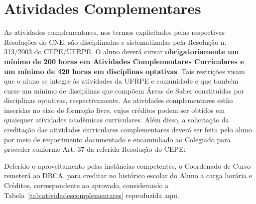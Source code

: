 \documentclass[
	12pt,				%
	openright,			%
  oneside,     %
	a4paper,			%
	english,			%
	french,				%
	spanish,			%
	brazil				%
	]{abntex2}
\begin{document}
%
%

\chapter{Atividades Complementares}
As atividades complementares,  nos termos explicitados pelas respectivas
Resoluções do CNE, são disciplinadas  e sistematizadas pela Resolução n.
313/2003 do CEPE/UFRPE. O aluno deverá cursar  \textbf{obrigatoriamente um
mínimo de 200 horas em Atividades Complementares Curriculares e um mínimo de  420 horas em
disciplinas optativas}. Tais restrições visam que o aluno se integre  às atividades da UFRPE e comunidade e
que também curse um mínimo de disciplinas  que compõem Áreas de Saber
constituídas por disciplinas optativas,  respectivamente. As atividades
complementares estão inseridas no eixo de  formação livre, cujos créditos podem
ser obtidos em quaisquer atividades acadêmicas  curriculares. Além disso, a
solicitação da creditação das atividades curriculares  complementares deverá ser
feita pelo aluno por meio de requerimento documentado e  encaminhado ao
Colegiado para proceder conforme Art. 37 da referida  Resolução do CEPE:

Deferido o aproveitamento pelas instâncias competentes,  o Coordenado de Curso
remeterá ao DRCA, para creditar no histórico escolar do  Aluno a carga horária e
Créditos, correspondente ao aprovado, considerando a Tabela~\ref{tab:atividadescomplementares} reproduzida aqui.

\end{document}
